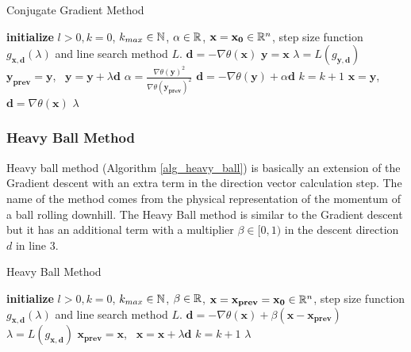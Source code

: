 \documentclass[a4paper,english,titlepage,12pt]{article}
\newcommand{\vect}[1]{\ensuremath{\mathbf{#1}}}
\newcommand{\norm}[1]{\ensuremath\Vert #1 \Vert}
\newcommand{\R}{\ensuremath\mathbb{R}}
\newcommand{\N}{\ensuremath\mathbb{N}}
\begin{document}
\begin{algorithm}[H]
\caption{Conjugate Gradient Method}
\label{alg_conjugate_gradient}
\begin{algorithmic}[1]
\STATE \textbf{initialize} $l > 0, k = 0$, $k_{max} \in \N$, $\alpha \in \R$, $\vect{x} = \vect{x_0} \in \R^n$, step size function $g_{\vect{x}, \vect{d}}(\lambda)$ and line search method $L$.
\STATE $\vect{d} = -\nabla \theta(\vect{x})$
\WHILE{$\norm{\nabla \theta(\vect{x})} > l$ \AND $k < k_{max}$}
    \STATE $\vect{y} = \vect{x}$
        \STATE $\lambda = L(g_{\vect{y}, \vect{d}})$
        \STATE $\vect{y_{prev}} = \vect{y}$, \ $\vect{y} = \vect{y} + \lambda \vect{d}$
        \STATE $\alpha = \frac{\nabla \theta(\vect{y})^2}{\nabla \theta(\vect{y_{prev}})^2}$
        \STATE $\vect{d} = -\nabla \theta(\vect{y}) + \alpha \vect{d}$
        \STATE $k = k + 1$
    \ENDFOR
    \STATE $\vect{x} = \vect{y}$, \ $\vect{d} = \nabla \theta(\vect{x})$
\ENDWHILE
\RETURN $\lambda$
\end{algorithmic}
\end{algorithm}


\subsubsection{Heavy Ball Method}

Heavy ball method (Algorithm \ref{alg_heavy_ball}) is basically an extension of the Gradient descent with an extra term in the direction vector calculation step. The name of the method comes from the  physical representation of the momentum of a ball rolling downhill. The Heavy Ball method is similar to the Gradient descent but it has an additional term with a multiplier $\beta \in [0, 1)$ in the descent direction $d$ in line 3.

\begin{algorithm}[H]
\caption{Heavy Ball Method}
\label{alg_heavy_ball}
\begin{algorithmic}[1]
\STATE \textbf{initialize} $l > 0, k = 0$, $k_{max} \in \N$, $\beta \in \R$, $\vect{x} = \vect{x_{prev}} = \vect{x_0} \in \R^n$, step size function $g_{\vect{x}, \vect{d}}(\lambda)$ and line search method $L$.
\WHILE{$\norm{\nabla \theta(\vect{x})} > l$ \AND $k < k_{max}$}
    \STATE $\vect{d} = -\nabla \theta(\vect{x}) + \beta (\vect{x} - \vect{x_{prev}})$
    \STATE $\lambda = L(g_{\vect{x}, \vect{d}})$
    \STATE $\vect{x_{prev}} = \vect{x}$, \ $\vect{x} = \vect{x} + \lambda \vect{d}$
    \STATE $k = k + 1$
\ENDWHILE
\RETURN $\lambda$
\end{algorithmic}
\end{algorithm}
\end{document}
